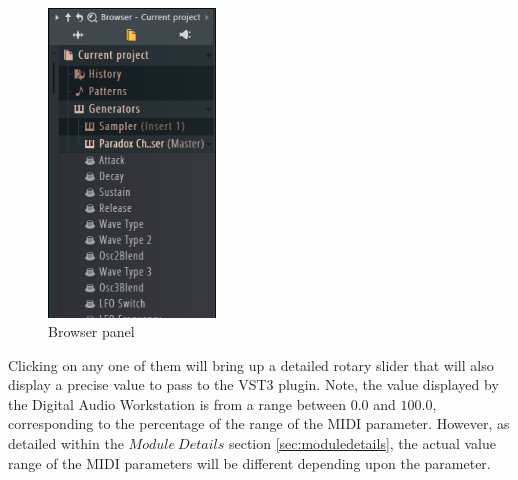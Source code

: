 \documentclass[a4paper,12pt]{report}
\begin{document}
\begin{figure} \centering
\includegraphics[width=12em]{BrowserPanel2.png}
    \caption{Browser panel}     \label{fig:browserpanel} \end{figure}

Clicking on any one of them will bring up a detailed rotary slider that will also display a precise value to pass to the VST3 plugin. Note, the value displayed by the Digital Audio Workstation is from a range between $0.0$ and $100.0$, corresponding to the percentage of the range of the MIDI parameter. However, as detailed within the $Module\ Details$ section \ref{sec:moduledetails}, the actual value range of the MIDI parameters will be different depending upon the parameter.
\end{document}

